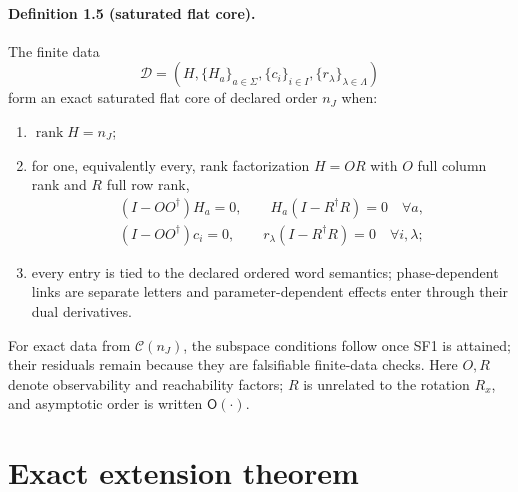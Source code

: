 \documentclass[aps,prl,onecolumn,superscriptaddress,nofootinbib]{revtex4-2}
\newcommand{\rank}{\operatorname{rank}}
\newcommand{\cC}{\mathcal C}
\newcommand{\cD}{\mathcal D}
\begin{document}
\paragraph{Definition 1.5 (saturated flat core).}
The finite data
\begin{equation}
 \cD=(H,\{H_a\}_{a\in\Sigma},\{c_i\}_{i\in I},
 \{r_\lambda\}_{\lambda\in\Lambda})
 \label{eq:data-core}
\end{equation}
form an exact saturated flat core of declared order $n_J$ when:
\begin{enumerate}
\item[(SF1)] $\rank H=n_J$;
\item[(SF2)] for one, equivalently every, rank factorization $H=OR$ with $O$ full column rank and $R$ full row rank,
\begin{equation}
 \begin{gathered}
 (I-OO^\dagger)H_a=0,
 \qquad H_a(I-R^\dagger R)=0\quad\forall a,\\
 (I-OO^\dagger)c_i=0,
 \qquad r_\lambda(I-R^\dagger R)=0\quad\forall i,\lambda;
 \end{gathered}
 \label{eq:SF23}
\end{equation}
\item[(SF3)] every entry is tied to the declared ordered word semantics; phase-dependent links are separate letters and parameter-dependent effects enter through their dual derivatives.
\end{enumerate}
For exact data from $\cC(n_J)$, the subspace conditions follow once SF1 is attained; their residuals remain because they are falsifiable finite-data checks.  Here $O,R$ denote observability and reachability factors; $R$ is unrelated to the rotation $R_x$, and asymptotic order is written $\mathsf O(\cdot)$.

\section{Exact extension theorem}
\label{sec:exact-proof}
\end{document}
